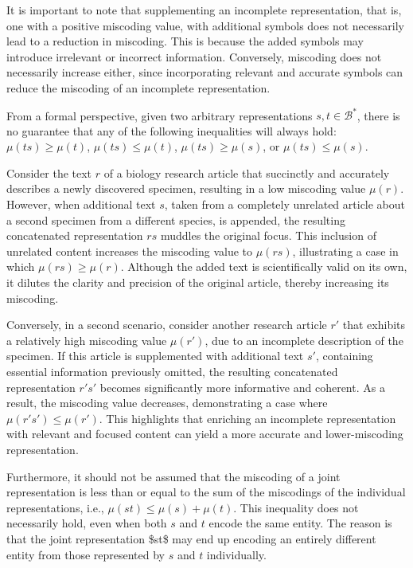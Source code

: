 It is important to note that supplementing an incomplete representation, that is, one with a positive miscoding value, with additional symbols does not necessarily lead to a reduction in miscoding. This is because the added symbols may introduce irrelevant or incorrect information. Conversely, miscoding does not necessarily increase either, since incorporating relevant and accurate symbols can reduce the miscoding of an incomplete representation.

From a formal perspective, given two arbitrary representations $s, t \in \mathcal{B}^\ast$, there is no guarantee that any of the following inequalities will always hold: $\mu(ts) \geq \mu(t)$, $\mu(ts) \leq \mu(t)$, $\mu(ts) \geq \mu(s)$, or $\mu(ts) \leq \mu(s)$.

\begin{example}
Consider the text $r$ of a biology research article that succinctly and accurately describes a newly discovered specimen, resulting in a low miscoding value $\mu(r)$. However, when additional text $s$, taken from a completely unrelated article about a second specimen from a different species, is appended, the resulting concatenated representation $rs$ muddles the original focus. This inclusion of unrelated content increases the miscoding value to $\mu(rs)$, illustrating a case in which $\mu(rs) \geq \mu(r)$. Although the added text is scientifically valid on its own, it dilutes the clarity and precision of the original article, thereby increasing its miscoding.

Conversely, in a second scenario, consider another research article $r'$ that exhibits a relatively high miscoding value $\mu(r')$, due to an incomplete description of the specimen. If this article is supplemented with additional text $s'$, containing essential information previously omitted, the resulting concatenated representation $r's'$ becomes significantly more informative and coherent. As a result, the miscoding value decreases, demonstrating a case where $\mu(r's') \leq \mu(r')$. This highlights that enriching an incomplete representation with relevant and focused content can yield a more accurate and lower-miscoding representation.
\end{example}

Furthermore, it should not be assumed that the miscoding of a joint representation is less than or equal to the sum of the miscodings of the individual representations, i.e., $\mu(st) \leq \mu(s) + \mu(t)$. This inequality does not necessarily hold, even when both $s$ and $t$ encode the same entity. The reason is that the joint representation \$st\$ may end up encoding an entirely different entity from those represented by $s$ and $t$ individually.

